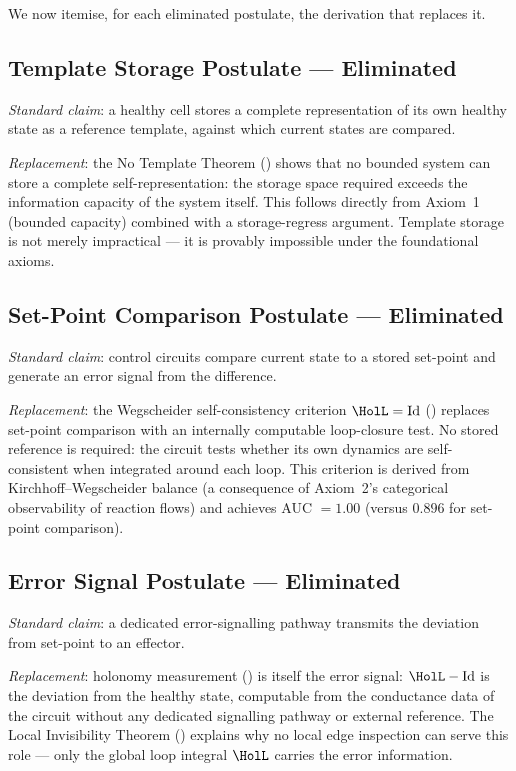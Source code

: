 We now itemise, for each eliminated postulate, the derivation that replaces it.

\subsection{Template Storage Postulate — Eliminated}

\emph{Standard claim}: a healthy cell stores a complete representation of its
own healthy state as a reference template, against which current states are
compared.

\emph{Replacement}: the No Template Theorem () shows
that no bounded system can store a complete self-representation: the storage
space required exceeds the information capacity of the system itself.  This
follows directly from Axiom~1 (bounded capacity) combined with a
storage-regress argument.  Template storage is not merely impractical — it
is provably impossible under the foundational axioms.

\subsection{Set-Point Comparison Postulate — Eliminated}

\emph{Standard claim}: control circuits compare current state to a stored
set-point and generate an error signal from the difference.

\emph{Replacement}: the Wegscheider self-consistency criterion $\HolL = \mathrm{Id}$
() replaces set-point comparison with an
internally computable loop-closure test.  No stored reference is required:
the circuit tests whether its own dynamics are self-consistent when integrated
around each loop.  This criterion is derived from Kirchhoff--Wegscheider
balance (a consequence of Axiom~2's categorical observability of reaction flows)
and achieves AUC $= 1.00$ (versus $0.896$ for set-point comparison).

\subsection{Error Signal Postulate — Eliminated}

\emph{Standard claim}: a dedicated error-signalling pathway transmits the
deviation from set-point to an effector.

\emph{Replacement}: holonomy measurement () is itself
the error signal: $\HolL - \mathrm{Id}$ is the deviation from the healthy
state, computable from the conductance data of the circuit without any
dedicated signalling pathway or external reference.  The Local Invisibility
Theorem () explains why no local edge inspection can
serve this role — only the global loop integral $\HolL$ carries the error
information.

